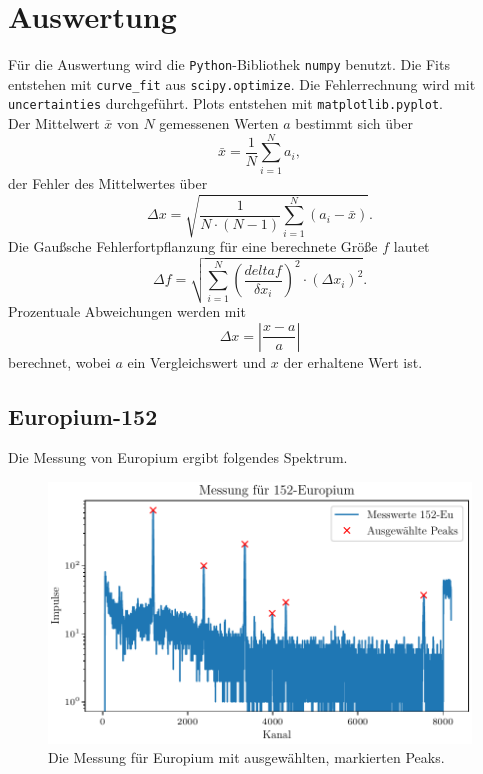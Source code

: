 \section{Auswertung}
\label{sec:Auswertung}

Für die Auswertung wird die \texttt{Python}-Bibliothek \texttt{numpy} benutzt. Die Fits entstehen mit \texttt{curve\_fit} aus \texttt{scipy.optimize}.
Die Fehlerrechnung wird mit \texttt{uncertainties} durchgeführt. Plots entstehen mit \texttt{matplotlib.pyplot}. \\
Der Mittelwert $\bar{x}$ von $N$ gemessenen Werten $a$ bestimmt sich über
\begin{equation}
    \bar{x} = \frac{1}{N} \sum^N_{i=1} a_i,
    \label{eq:mittelwerte}
\end{equation}
der Fehler des Mittelwertes über
\begin{equation}
    \Delta x = \sqrt{\frac{1}{N \cdot (N-1)} \sum^N_{i=1}(a_i - \bar{x})}.
    \label{eq:mittelwerte_fehler}
\end{equation}
Die Gaußsche Fehlerfortpflanzung für eine berechnete Größe $f$ lautet
\begin{equation}
    \Delta f = \sqrt{ \sum^N_{i=1} \left( \frac{delta f}{\delta x_i}\right)^2 \cdot (\Delta x_i)^2}.
\end{equation}
Prozentuale Abweichungen werden mit
\begin{equation}
    \Delta x = \left|\frac{x - a}{a}\right|
\end{equation}
berechnet, wobei $a$ ein Vergleichswert und $x$ der erhaltene Wert ist.
\subsection{Europium-152}

Die Messung von Europium ergibt folgendes Spektrum.

\begin{figure}[H]
    \centering
    \includegraphics[width=\textwidth]{plots/Europium.pdf}
    \caption{Die Messung für Europium mit ausgewählten, markierten Peaks.}
    \label{fig:Europium}
\end{figure}

